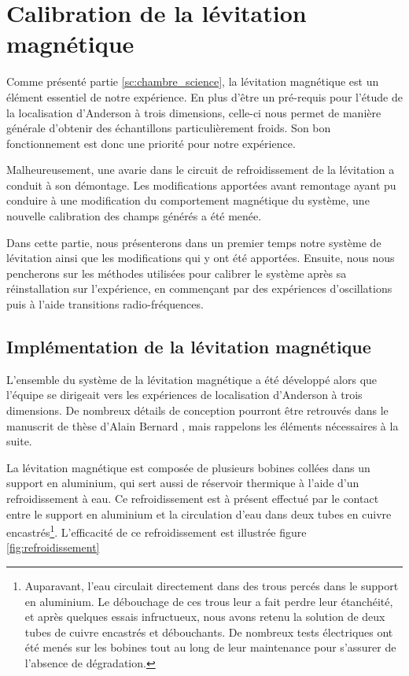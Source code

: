 \section{Calibration de la lévitation magnétique}
\label{sc:levitation}
Comme présenté partie \ref{sc:chambre_science}, la lévitation magnétique est un élément essentiel de notre expérience. En plus d'être un pré-requis pour l'étude de la localisation d'Anderson à trois dimensions, celle-ci nous permet de manière générale d'obtenir des échantillons particulièrement froids. Son bon fonctionnement est donc une priorité pour notre expérience.

Malheureusement, une avarie dans le circuit de refroidissement de la lévitation a conduit à son démontage. Les modifications apportées avant remontage ayant pu conduire à une modification du comportement magnétique du système, une nouvelle calibration des champs générés a été menée.

Dans cette partie, nous présenterons dans un premier temps notre système de lévitation ainsi que les modifications qui y ont été apportées. Ensuite, nous nous pencherons sur les méthodes utilisées pour calibrer le système après sa réinstallation sur l'expérience, en commençant par des expériences d'oscillations puis à l'aide transitions radio-fréquences.




\subsection{Implémentation de la lévitation magnétique}

L'ensemble du système de la lévitation magnétique a été développé alors que l'équipe se dirigeait vers les expériences de localisation d'Anderson à trois dimensions. De nombreux détails de conception pourront être retrouvés dans le manuscrit de thèse d'Alain Bernard \citep{bernard2010transport}, mais rappelons les éléments nécessaires à la suite.

La lévitation magnétique est composée de plusieurs bobines collées dans un support en aluminium, qui sert aussi de réservoir thermique à l'aide d'un refroidissement à eau. Ce refroidissement est à présent effectué par le contact entre le support en aluminium et la circulation d'eau dans deux tubes en cuivre encastrés\footnote{Auparavant, l'eau circulait directement dans des trous percés dans le support en aluminium. Le débouchage de ces trous leur a fait perdre leur étanchéité, et après quelques essais infructueux, nous avons retenu la solution de deux tubes de cuivre encastrés et débouchants. De nombreux tests électriques ont été menés sur les bobines tout au long de leur maintenance pour s'assurer de l'absence de dégradation.}. L'efficacité de ce refroidissement est illustrée figure \ref{fig:refroidissement}



